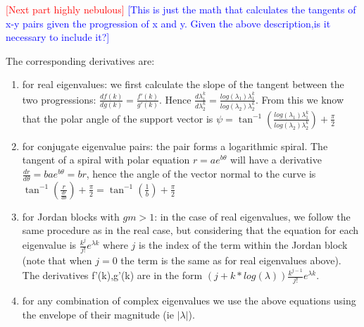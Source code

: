 \documentclass[twocolumn]{autart}    %
\begin{document}
\textcolor{red}{[Next part highly nebulous]} 
\textcolor{blue}{[This is just the math that calculates the tangents of x-y pairs given the progression of x and y. Given the above description,is it necessary to include it?]}

The corresponding derivatives are:
%
\begin{enumerate}
%
\item for real eigenvalues: we first calculate the slope of the tangent
between the two progressions: $\frac{d f(k)}{d g(k)}=\frac{f'(k)}{g'(k)}$. 
Hence $\frac{d \lambda_1^k}{d \lambda_2^k}=\frac{log(\lambda_1)
\lambda_1^k}{log(\lambda_2) \lambda_2^k}$.  From this we know that the polar
angle of the support vector is $\psi = \tan^{-1}(\frac{log(\lambda_1)
\lambda_1^k}{log(\lambda_2) \lambda_2^k})+\frac{\pi}{2}$
%
\item for conjugate eigenvalue pairs: the pair forms a logarithmic spiral. 
The tangent of a spiral with polar equation $r=a e^{b\theta}$ will have a
derivative $\frac{d r}{d \theta}=b a e^{b\theta}=b r$, hence the angle of
the vector normal to the curve is $\tan^{-1}(\frac{r}{\frac{d r}{d
\theta}})+\frac{\pi}{2}=\tan^{-1}(\frac{1}{b})+\frac{\pi}{2}$
%
\item for Jordan blocks with $gm>1$: in the case of real eigenvalues, we
follow the same procedure as in the real case, but considering that the
equation for each eigenvalue is $\frac{k^j}{j!}e^{\lambda k}$ where $j$ is
the index of the term within the Jordan block (note that when $j=0$ the term
is the same as for real eigenvalues above).  The derivatives f'(k),g'(k) are
in the form $(j+k*log(\lambda))\frac{k^{j-1}}{j!}e^{\lambda k}$.
%
\item for any combination of complex eigenvalues we use the above equations
using the envelope of their magnitude (ie $|\lambda|$).
%
\end{enumerate}
\end{document}
